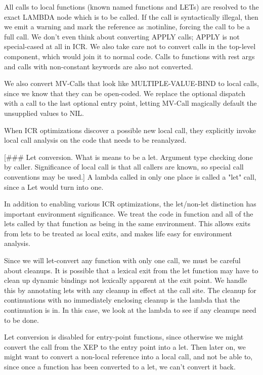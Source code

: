 All calls to local functions (known named functions and LETs) are resolved to
the exact LAMBDA node which is to be called.  If the call is syntactically
illegal, then we emit a warning and mark the reference as :notinline, forcing
the call to be a full call.  We don't even think about converting APPLY calls;
APPLY is not special-cased at all in ICR.  We also take care not to convert
calls in the top-level component, which would join it to normal code.  Calls to
functions with rest args and calls with non-constant keywords are also not
converted.

We also convert MV-Calls that look like MULTIPLE-VALUE-BIND to local calls,
since we know that they can be open-coded.  We replace the optional dispatch
with a call to the last optional entry point, letting MV-Call magically default
the unsupplied values to NIL.

When ICR optimizations discover a possible new local call, they explicitly
invoke local call analysis on the code that needs to be reanalyzed. 

[\#\#\# Let conversion.  What is means to be a let.  Argument type checking done
by caller.  Significance of local call is that all callers are known, so
special call conventions may be used.]
A lambda called in only one place is called a "let" call, since a Let would
turn into one.

In addition to enabling various ICR optimizations, the let/non-let distinction
has important environment significance.  We treat the code in function and all
of the lets called by that function as being in the same environment.  This
allows exits from lets to be treated as local exits, and makes life easy for
environment analysis.  

Since we will let-convert any function with only one call, we must be careful
about cleanups.  It is possible that a lexical exit from the let function may
have to clean up dynamic bindings not lexically apparent at the exit point.  We
handle this by annotating lets with any cleanup in effect at the call site.
The cleanup for continuations with no immediately enclosing cleanup is the
lambda that the continuation is in.  In this case, we look at the lambda to see
if any cleanups need to be done.

Let conversion is disabled for entry-point functions, since otherwise we might
convert the call from the XEP to the entry point into a let.  Then later on, we
might want to convert a non-local reference into a local call, and not be able
to, since once a function has been converted to a let, we can't convert it
back.



